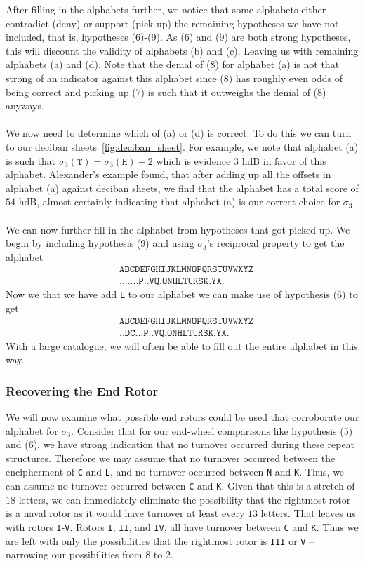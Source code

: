 \noindent  After filling in the alphabets further, we notice that
some alphabets either contradict (deny) or support (pick up) the
remaining hypotheses we have not included, that is, hypotheses
(6)-(9). As (6) and (9) are both strong hypotheses, this will
discount the validity of alphabets (b) and (c). Leaving us with
remaining alphabets (a) and (d). Note that the denial of (8) for
alphabet (a) is not that strong of an indicator against this
alphabet since (8) has roughly even odds of being correct and
picking up (7) is such that it outweighs the denial of (8) anyways.
\\\\We now need to determine which of (a) or (d) is correct. To do
this we can turn to our deciban sheets~\ref{fig:deciban_sheet}. For
example, we note that alphabet (a) is such that $\sigma_3(\texttt{T}) =
\sigma_3(\texttt{H}) + 2$ which is evidence $3$ hdB in favor of this
alphabet. Alexander's example found, that after adding up all the
offsets in alphabet (a) against deciban sheets, we find that the
alphabet has a total score of $54$ hdB, almost certainly indicating
that alphabet (a) is our correct choice for $\sigma_3$.
\\\\We can now further fill in the alphabet from hypotheses that
got picked up. We begin by including hypothesis (9) and using
$\sigma_3$'s reciprocal property to get the alphabet
\begin{align*}
  & \texttt{ABCDEFGHIJKLMNOPQRSTUVWXYZ} \\
  & \texttt{.......P..VQ.ONHLTURSK.YX.}
\end{align*}
Now we that we have add \texttt{L} to our alphabet we can make use
of hypothesis (6) to get
\begin{align*}
  & \texttt{ABCDEFGHIJKLMNOPQRSTUVWXYZ} \\
  & \texttt{..DC...P..VQ.ONHLTURSK.YX.}
\end{align*}
With a large catalogue, we will often be able to fill out the
entire alphabet in this way.

\subsubsection{Recovering the End Rotor}
We will now examine what possible end rotors could be used that
corroborate our alphabet for $\sigma_3$. Consider that for our
end-wheel comparisons like hypothesis (5) and (6), we have strong
indication that no turnover occurred during these repeat
structures. Therefore we may assume that no turnover occurred
between the encipherment of \texttt{C} and \texttt{L}, and no
turnover occurred between \texttt{N} and \texttt{K}. Thus, we can
assume no turnover occurred between \texttt{C} and \texttt{K}.
Given that this is a stretch of $18$ letters, we can immediately
eliminate the possibility that the rightmost rotor is a naval rotor
as it would have turnover at least every $13$ letters. That leaves
us with rotors \texttt{I}-\texttt{V}. Rotors \texttt{I},
\texttt{II}, and \texttt{IV}, all have turnover between \texttt{C}
and \texttt{K}. Thus we are left with only the possibilities that
the rightmost rotor is \texttt{III} or \texttt{V} -- narrowing our
possibilities from $8$ to $2$.

